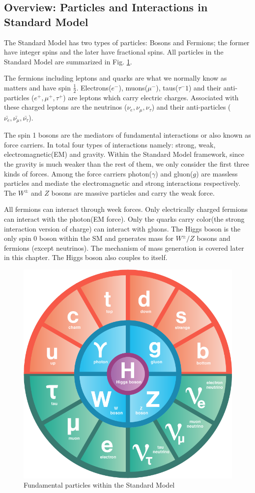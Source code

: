 \label{sec:theory-sm}
\subsection{Overview: Particles and Interactions in Standard Model}

The Standard Model has two types of particles: Bosons and Fermions; the former have integer spins and the later have fractional spins. All particles in the Standard Model are summarized in Fig. \ref{fig:theory-sm}.

The fermions including leptons and quarks are what we normally know as matters and have spin $\frac{1}{2}$. Electrons($e^-$), muons($\mu^-$), taus($\tau^-1$) and their anti-particles ($e^+,\mu^+,\tau^+$) are leptons which carry electric charges. Associated with these charged leptons are the neutrinos ($\nu_e,\nu_{\mu},\nu_{\tau}$) and their anti-particles ($\bar{\nu_e},\bar{\nu_{\mu}},\bar{\nu_{\tau}}$).

The spin 1 bosons are the mediators of fundamental interactions or also known as force carriers. In total four types of interactions namely: strong, weak, electromagnetic(EM) and gravity. Within the Standard Model framework, since the gravity is much weaker than the rest of them, we only consider the first three kinds of forces. Among the force carriers photon($\gamma$) and gluon($g$) are massless particles and mediate the electromagnetic and strong interactions respectively. The $W^{\pm}$ and $Z$ bosons are massive particles and carry the weak force. 

All fermions can interact through week forces. Only electrically charged fermions can interact with the photon(EM force). Only the quarks carry color(the strong interaction version of charge) can interact with gluons. The Higgs boson is the only spin 0 boson within the SM and generates mass for $W^{\pm}/Z$ bosons and fermions (except neutrinos). The mechanism of mass generation is covered later in this chapter. The Higgs boson also couples to itself. 

\begin{figure}[htpb!]
\begin{center}
  \includegraphics[width=0.45\linewidth]{figures/theory/SM}
\caption{Fundamental particles within the Standard Model}
\label{fig:theory-sm}
\end{center}
\end{figure}

